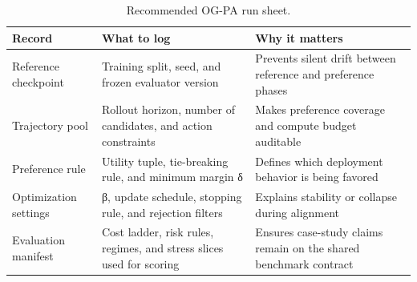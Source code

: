 \begin{table}[t]
\centering
\caption{Recommended OG-PA run sheet.}
\label{tab:table_34_ogpa_run_sheet}
\begin{tabular}{lll}
\toprule
Record & What to log & Why it matters \\
\midrule
Reference checkpoint & Training split, seed, and frozen evaluator version & Prevents silent drift between reference and preference phases \\
Trajectory pool & Rollout horizon, number of candidates, and action constraints & Makes preference coverage and compute budget auditable \\
Preference rule & Utility tuple, tie-breaking rule, and minimum margin δ & Defines which deployment behavior is being favored \\
Optimization settings & β, update schedule, stopping rule, and rejection filters & Explains stability or collapse during alignment \\
Evaluation manifest & Cost ladder, risk rules, regimes, and stress slices used for scoring & Ensures case-study claims remain on the shared benchmark contract \\
\bottomrule
\end{tabular}
\end{table}
